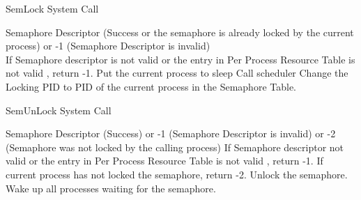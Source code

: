 
\begin{algorithm}
\caption{SemLock System Call}
\begin{algorithmic}
\REQUIRE Semaphore Descriptor
 (Success or the semaphore is already locked by the current process) or -1 (Semaphore Descriptor is invalid)
\\
\STATE If Semaphore descriptor is not valid or the entry in Per Process Resource Table is not valid , return -1.
    \STATE Put the current process to sleep 
    \STATE Call scheduler
\ENDWHILE
\STATE Change the Locking PID to PID of the current process in the Semaphore Table.
\end{algorithmic}
\end{algorithm}


\begin{algorithm}
\caption{SemUnLock System Call}
\begin{algorithmic}
\REQUIRE Semaphore Descriptor
 (Success) or -1 (Semaphore Descriptor is invalid) or -2 (Semaphore was not locked by the calling process)
\STATE If Semaphore descriptor not valid or the entry in Per Process Resource Table is not valid , return -1.
    \STATE If current process has not locked the semaphore, return -2.
    \STATE Unlock the semaphore.
    \STATE Wake up all processes waiting for the semaphore.
\ENDIF
{}
\end{algorithmic}
\end{algorithm}




